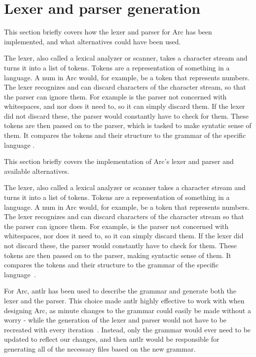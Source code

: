\section{Lexer and parser generation}\label{sec:lexerandparsergen}
This section briefly covers how the lexer and parser for Arc has been implemented, and what alternatives could have been used.

The lexer, also called a lexical analyzer or scanner, takes a character stream and turns it into a list of tokens. Tokens are a representation of something in a language. A num in Arc would, for example, be a token that represents numbers. The lexer recognizes and can discard characters of the character stream, so that the parser can ignore them. For example is the parser not concerned with whitespaces, and nor does it need to, so it can simply discard them. If the lexer did not discard these, the parser would constantly have to check for them. These tokens are then passed on to the parser, which is tasked to make syntatic sense of them. It compares the tokens and their structure to the grammar of the specific language .

This section briefly covers the implementation of Arc's lexer and parser and available alternatives.

The lexer, also called a lexical analyzer or scanner takes a character stream and turns it into a list of tokens. Tokens are a representation of something in a language. A num in Arc would, for example, be a token that represents numbers. The lexer recognizes and can discard characters of the character stream so that the parser can ignore them. For example, is the parser not concerned with whitespaces, nor does it need to, so it can simply discard them. If the lexer did not discard these, the parser would constantly have to check for them. These tokens are then passed on to the parser, making syntactic sense of them. It compares the tokens and their structure to the grammar of the specific language~\cite{Parr2014}.

For Arc, \gls{antlr} has been used to describe the grammar and generate both the lexer and the parser. This choice made \gls{antlr} highly effective to work with when designing Arc, as minute changes to the grammar could easily be made without a worry - while the generation of the lexer and parser would not have to be recreated with every iteration~\cite{Parr2014}. Instead, only the grammar would ever need to be updated to reflect our changes, and then \gls{antlr}  would be responsible for generating all of the necessary files based on the new grammar.

